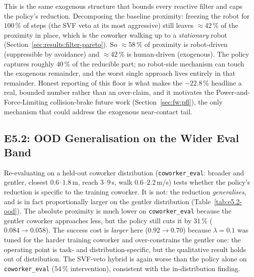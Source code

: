 \documentclass[11pt,a4paper]{report}
\begin{document}
This is the same exogenous structure that bounds every reactive
filter and caps the policy's reduction. Decomposing the baseline
proximity: freezing the robot for $100\,\%$ of steps (the SVF veto at
its most aggressive) still leaves $\approx$42\,\% of the proximity in
place, which is the coworker walking up to a \emph{stationary} robot
(Section~\ref{sec:results:filter-pareto}). So $\approx$58\,\% of
proximity is robot-driven (suppressible by avoidance) and
$\approx$42\,\% is human-driven (exogenous). The policy captures
roughly $40\,\%$ of the reducible part; no robot-side mechanism can
touch the exogenous remainder, and the worst single approach lives
entirely in that remainder. Honest reporting of this floor is what
makes the $-22.8\,\%$ headline a real, bounded number rather than an
over-claim, and it motivates the Power-and-Force-Limiting
collision-brake future work (Section~\ref{sec:fw:pfl}), the only
mechanism that could address the exogenous near-contact tail.

\subsection{E5.2: OOD Generalisation on the Wider Eval Band}
\label{sec:results:ood}

Re-evaluating on a held-out coworker distribution
(\texttt{coworker\_eval}: broader and gentler, closest $0.6$--$1.8$\,m,
reach $3$--$9$\,s, walk $0.6$--$2.2$\,m/s) tests whether the policy's
reduction is specific to the training coworker. It is not: the
reduction \emph{generalises}, and is in fact proportionally larger on
the gentler distribution (Table~\ref{tab:e5.2-ood}). The absolute
proximity is much lower on \texttt{coworker\_eval} because the gentler
coworker approaches less, but the policy still cuts it by $31\,\%$
($0.084 \rightarrow 0.058$). The success cost is \emph{larger} here
($0.92 \rightarrow 0.70$) because $\lambda = 0.1$ was tuned for the
harder training coworker and over-constrains the gentler one: the
operating point is task- and distribution-specific, but the
qualitative result holds out of distribution. The SVF-veto hybrid is
again worse than the policy alone on \texttt{coworker\_eval}
($54\,\%$ intervention), consistent with the in-distribution finding.
\end{document}
